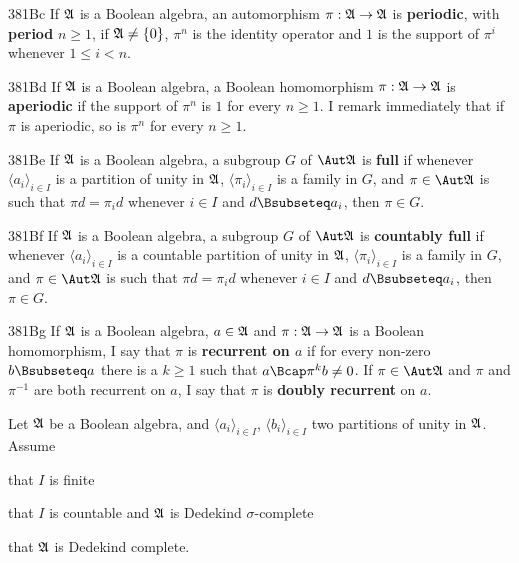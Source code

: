 \spheader 381Bc If $\frak A$ is a Boolean algebra, an automorphism
$\pi:\frak A\to\frak A$ is
{\bf periodic}, with {\bf period} $n\ge 1$, if $\frak A\ne\{0\}$,
$\pi^n$ is the identity operator and $1$ is the support of $\pi^i$
whenever $1\le i<n$.

\spheader 381Bd If $\frak A$ is a Boolean algebra, a Boolean
homomorphism $\pi:\frak A\to\frak A$
is {\bf aperiodic} if the support of $\pi^n$ is $1$ for every $n\ge 1$.
I remark immediately that if $\pi$ is aperiodic, so is $\pi^n$ for every
$n\ge 1$.   

\spheader 381Be If $\frak A$ is a Boolean
algebra, a subgroup $G$ of $\Aut\frak A$ is {\bf full} if whenever
$\langle a_i\rangle_{i\in I}$ is a partition of
unity in $\frak A$, $\langle\pi_i\rangle_{i\in I}$ is a family in
$G$, and $\pi\in\Aut\frak A$ is such that $\pi d=\pi_id$ whenever
$i\in I$ and $d\Bsubseteq a_i$, then $\pi\in G$.

\spheader 381Bf If $\frak A$ is a Boolean
algebra, a subgroup $G$ of $\Aut\frak A$ is {\bf countably full} if
whenever $\langle a_i\rangle_{i\in I}$ is a countable partition of
unity in $\frak A$, $\langle\pi_i\rangle_{i\in I}$ is a family in
$G$, and $\pi\in\Aut\frak A$ is such that $\pi d=\pi_id$ whenever
$i\in I$ and $d\Bsubseteq a_i$, then $\pi\in G$.

\spheader 381Bg If $\frak A$ is a Boolean algebra, $a\in\frak A$ and
$\pi:\frak A\to\frak A$ is a Boolean homomorphism, I say that $\pi$ is
{\bf recurrent on $a$} if for every non-zero $b\Bsubseteq a$ there is a
$k\ge 1$ such that $a\Bcap\pi^kb\ne 0$.
If $\pi\in\Aut\frak A$ and $\pi$ and $\pi^{-1}$ are both recurrent on
$a$, I say that $\pi$ is {\bf doubly recurrent} on $a$.

 Let $\frak A$ be a Boolean algebra, and
$\langle a_i\rangle_{i\in I}$, $\langle b_i\rangle_{i\in I}$ two
partitions of unity in $\frak A$.   Assume

 that $I$ is finite

 that $I$ is countable and $\frak A$ is Dedekind
$\sigma$-complete

 that $\frak A$ is Dedekind complete.


